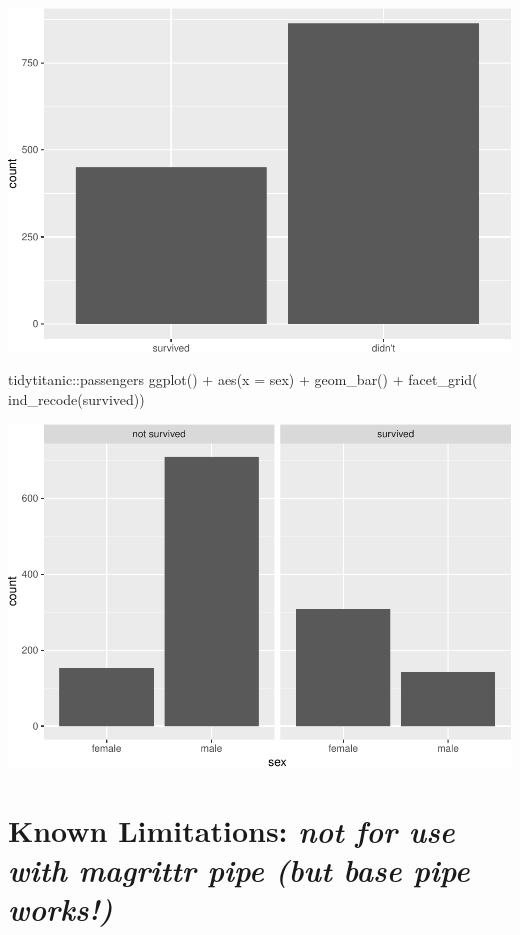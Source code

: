 \begin{Schunk}
\includegraphics[width=0.69\linewidth]{r_journal_files/figure-latex/unnamed-chunk-17-3} \begin{Sinput}
tidytitanic::passengers %
ggplot() + 
  aes(x = sex) + 
  geom_bar() + 
  facet_grid(~ ind_recode(survived))
\end{Sinput}

\includegraphics[width=0.69\linewidth]{r_journal_files/figure-latex/unnamed-chunk-17-4} \end{Schunk}

\hypertarget{known-limitations-not-for-use-with-magrittr-pipe-but-base-pipe-works}{%
\section{\texorpdfstring{Known Limitations: \emph{not for use with
magrittr pipe (but base pipe
works!)}}{Known Limitations: not for use with magrittr pipe (but base pipe works!)}}\label{known-limitations-not-for-use-with-magrittr-pipe-but-base-pipe-works}}


